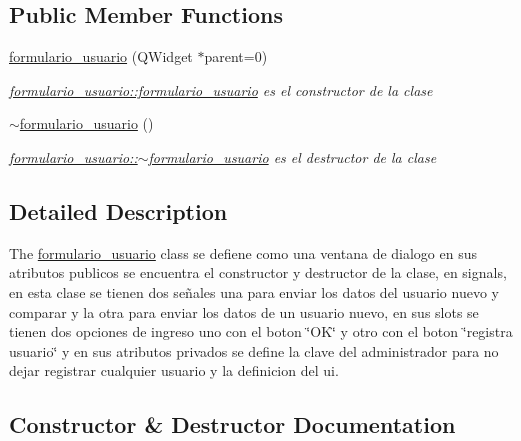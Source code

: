 \subsection*{Public Member Functions}
\begin{DoxyCompactItemize}
\item 
\hyperlink{classformulario__usuario_a85cf7bd7b98128c1690d7825b0d6493d}{formulario\+\_\+usuario} (Q\+Widget $\ast$parent=0)
\begin{DoxyCompactList}\small\item\em \hyperlink{classformulario__usuario_a85cf7bd7b98128c1690d7825b0d6493d}{formulario\+\_\+usuario\+::formulario\+\_\+usuario} es el constructor de la clase \end{DoxyCompactList}\item 
\mbox{\label{classformulario__usuario_a5e4007c79bdb22b028d339b0c9fae3f1}} 
\hyperlink{classformulario__usuario_a5e4007c79bdb22b028d339b0c9fae3f1}{$\sim$formulario\+\_\+usuario} ()
\begin{DoxyCompactList}\small\item\em \hyperlink{classformulario__usuario_a5e4007c79bdb22b028d339b0c9fae3f1}{formulario\+\_\+usuario\+::$\sim$formulario\+\_\+usuario} es el destructor de la clase \end{DoxyCompactList}\end{DoxyCompactItemize}


\subsection{Detailed Description}
The \hyperlink{classformulario__usuario}{formulario\+\_\+usuario} class se defiene como una ventana de dialogo en sus atributos publicos se encuentra el constructor y destructor de la clase, en signals, en esta clase se tienen dos señales una para enviar los datos del usuario nuevo y comparar y la otra para enviar los datos de un usuario nuevo, en sus slots se tienen dos opciones de ingreso uno con el boton \char`\"{}\+O\+K\char`\"{} y otro con el boton \char`\"{}registra usuario\char`\"{} y en sus atributos privados se define la clave del administrador para no dejar registrar cualquier usuario y la definicion del ui. 

\subsection{Constructor \& Destructor Documentation}
\mbox{\label{classformulario__usuario_a85cf7bd7b98128c1690d7825b0d6493d}} 

